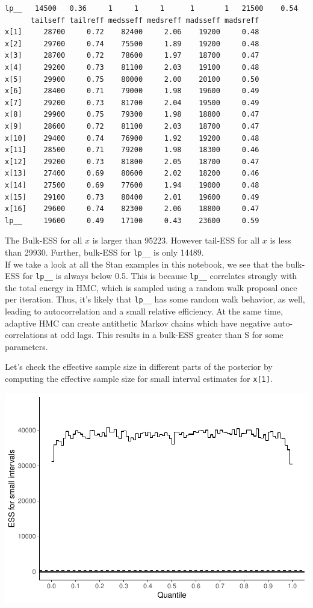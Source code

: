 \documentclass[american,]{article}
\begin{document}
\begin{verbatim}
lp__   14500   0.36     1     1     1      1       1   21500    0.54
      tailseff tailreff medsseff medsreff madsseff madsreff
x[1]     28700     0.72    82400     2.06    19200     0.48
x[2]     29700     0.74    75500     1.89    19200     0.48
x[3]     28700     0.72    78600     1.97    18700     0.47
x[4]     29200     0.73    81100     2.03    19100     0.48
x[5]     29900     0.75    80000     2.00    20100     0.50
x[6]     28400     0.71    79000     1.98    19600     0.49
x[7]     29200     0.73    81700     2.04    19500     0.49
x[8]     29900     0.75    79300     1.98    18800     0.47
x[9]     28600     0.72    81100     2.03    18700     0.47
x[10]    29400     0.74    76900     1.92    19200     0.48
x[11]    28500     0.71    79200     1.98    18300     0.46
x[12]    29200     0.73    81800     2.05    18700     0.47
x[13]    27400     0.69    80600     2.02    18200     0.46
x[14]    27500     0.69    77600     1.94    19000     0.48
x[15]    29100     0.73    80400     2.01    19600     0.49
x[16]    29600     0.74    82300     2.06    18800     0.47
lp__     19600     0.49    17100     0.43    23600     0.59
\end{verbatim}

The Bulk-ESS for all \(x\) is larger than 95223. However tail-ESS for
all \(x\) is less than 29930. Further, bulk-ESS for \texttt{lp\_\_} is
only 14489.\\
If we take a look at all the Stan examples in this notebook, we see that
the bulk-ESS for \texttt{lp\_\_} is always below 0.5. This is because
\texttt{lp\_\_} correlates strongly with the total energy in HMC, which
is sampled using a random walk proposal once per iteration. Thus, it's
likely that \texttt{lp\_\_} has some random walk behavior, as well,
leading to autocorrelation and a small relative efficiency. At the same
time, adaptive HMC can create antithetic Markov chains which have
negative auto-correlations at odd lags. This results in a bulk-ESS
greater than S for some parameters.

Let's check the effective sample size in different parts of the
posterior by computing the effective sample size for small interval
estimates for \texttt{x{[}1{]}}.

\includegraphics{graphics/local-ess-fit-n-1.pdf}
\end{document}
